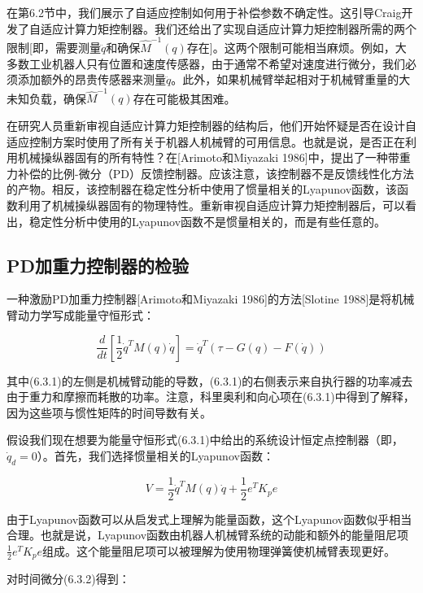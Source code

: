 \documentclass[12pt,a4paper]{ctexart}
\begin{document}
在第6.2节中，我们展示了自适应控制如何用于补偿参数不确定性。这引导Craig开发了自适应计算力矩控制器。我们还给出了实现自适应计算力矩控制器所需的两个限制[即，需要测量$\ddot{q}$和确保$\hat{M}^{-1}(q)$存在]。这两个限制可能相当麻烦。例如，大多数工业机器人只有位置和速度传感器，由于通常不希望对速度进行微分，我们必须添加额外的昂贵传感器来测量$\ddot{q}$。此外，如果机械臂举起相对于机械臂重量的大未知负载，确保$\hat{M}^{-1}(q)$存在可能极其困难。

在研究人员重新审视自适应计算力矩控制器的结构后，他们开始怀疑是否在设计自适应控制方案时使用了所有关于机器人机械臂的可用信息。也就是说，是否正在利用机械操纵器固有的所有特性？在[Arimoto和Miyazaki 1986]中，提出了一种带重力补偿的比例-微分（PD）反馈控制器。应该注意，该控制器不是反馈线性化方法的产物。相反，该控制器在稳定性分析中使用了惯量相关的Lyapunov函数，该函数利用了机械操纵器固有的物理特性。重新审视自适应计算力矩控制器后，可以看出，稳定性分析中使用的Lyapunov函数不是惯量相关的，而是有些任意的。

\subsection*{PD加重力控制器的检验}

一种激励PD加重力控制器[Arimoto和Miyazaki 1986]的方法[Slotine 1988]是将机械臂动力学写成能量守恒形式：

\begin{equation}\label{eq:energy-conservation}
\frac{d}{dt}\left[\frac{1}{2}\dot{q}^T M(q) \dot{q}\right] = \dot{q}^T (\tau - G(q) - F(\dot{q}))
\end{equation}

其中(6.3.1)的左侧是机械臂动能的导数，(6.3.1)的右侧表示来自执行器的功率减去由于重力和摩擦而耗散的功率。注意，科里奥利和向心项在(6.3.1)中得到了解释，因为这些项与惯性矩阵的时间导数有关。

假设我们现在想要为能量守恒形式(6.3.1)中给出的系统设计恒定点控制器（即，$\dot{q}_d = 0$）。首先，我们选择惯量相关的Lyapunov函数：

\begin{equation}\label{eq:inertia-lyapunov}
V = \frac{1}{2}\dot{q}^T M(q) \dot{q} + \frac{1}{2}e^T K_p e
\end{equation}

由于Lyapunov函数可以从启发式上理解为能量函数，这个Lyapunov函数似乎相当合理。也就是说，Lyapunov函数由机器人机械臂系统的动能和额外的能量阻尼项$\frac{1}{2}e^T K_p e$组成。这个能量阻尼项可以被理解为使用物理弹簧使机械臂表现更好。

对时间微分(6.3.2)得到：
\end{document}
